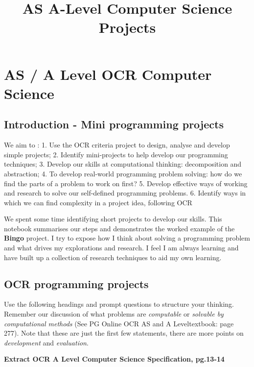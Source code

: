 \documentclass[11pt]{article}
\title{AS A-Level Computer Science Projects}
\begin{document}
    
    
    \maketitle
    
    

    
    \section{AS / A Level OCR Computer
Science}\label{as-a-level-ocr-computer-science}

    \subsection{Introduction - Mini programming
projects}\label{introduction---mini-programming-projects}

    We aim to : 1. Use the OCR criteria project to design, analyse and
develop simple projects; 2. Identify mini-projects to help develop our
programming techniques; 3. Develop our skills at computational thinking:
decomposition and abstraction; 4. To develop real-world programming
problem solving: how do we find the parts of a problem to work on first?
5. Develop effective ways of working and research to solve our
self-defined programming problems. 6. Identify ways in which we can find
complexity in a project idea, following OCR

We spent some time identifying short projects to develop our skills.
This notebook summarises our steps and demonstrates the worked example
of the \textbf{Bingo} project. I try to expose how I think about solving
a programming problem and what drives my explorations and research. I
feel I am always learning and have built up a collection of research
techniques to aid my own learning.

    \subsection{OCR programming projects}\label{ocr-programming-projects}

    Use the following headings and prompt questions to structure your
thinking. Remember our discussion of what problems are \emph{computable}
or \emph{solvable by computational methods} (See PG Online OCR AS and A
Leveltextbook: page 277). Note that these are just the first few
statements, there are more points on \emph{development} and
\emph{evaluation}.

\textbf{Extract OCR A Level Computer Science Specification, pg.13-14}
\end{document}
